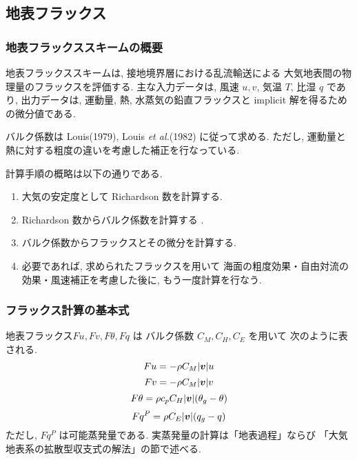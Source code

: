 ﻿
\subsection{地表フラックス}

\subsubsection{地表フラックススキームの概要}

地表フラックススキームは, 
接地境界層における乱流輸送による
大気地表間の物理量のフラックスを評価する.
主な入力データは, 風速 $u, v$, 気温 $T$, 比湿 $q$ であり,
出力データは, 運動量, 熱, 水蒸気の鉛直フラックスと
implicit 解を得るための微分値である.

バルク係数は Louis(1979), Louis {\em et al.}(1982) に従って求める. 
ただし, 運動量と熱に対する粗度の違いを考慮した補正を行なっている. 

計算手順の概略は以下の通りである.
\begin{enumerate}
\item 大気の安定度として
      Richardson 数を計算する.
\item Richardson 数からバルク係数を計算する .
\item バルク係数からフラックスとその微分を計算する.
\item 必要であれば, 求められたフラックスを用いて
      海面の粗度効果・自由対流の効果・風速補正を考慮した後に,
      もう一度計算を行なう.
\end{enumerate}

\subsubsection{フラックス計算の基本式}

地表フラックス$ Fu, Fv, F\theta, Fq$ は
バルク係数 $C_M, C_H, C_E$ を用いて
次のように表される.
%
\begin{equation}
Fu  =  - \rho C_M |\Dvect{v}| u
\end{equation}
\begin{equation}
Fv  =  - \rho C_M |\Dvect{v}| v
\end{equation}
\begin{equation}
F\theta  = \rho c_p C_H |\Dvect{v}| ( \theta_g - \theta )
\end{equation}
\begin{equation}
Fq^P =  \rho C_E |\Dvect{v}| ( q_g - q )
\end{equation}
%
ただし, $Fq^P$ は可能蒸発量である.
実蒸発量の計算は「地表過程」ならび
「大気地表系の拡散型収支式の解法」の節で述べる.

